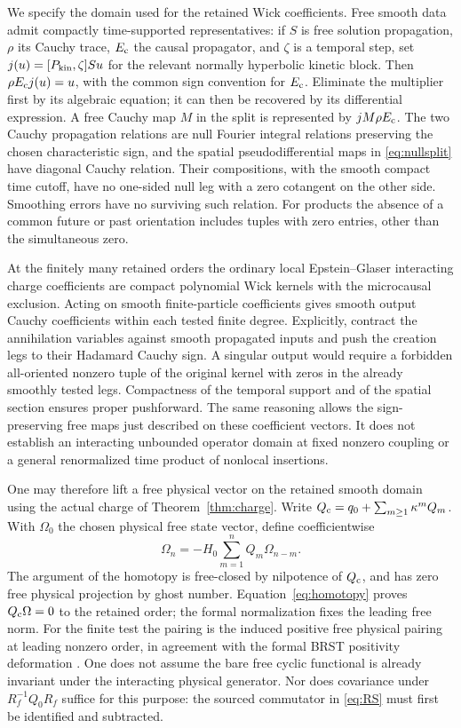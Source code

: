 We specify the domain used for the retained Wick coefficients. Free smooth data admit compactly time-supported representatives: if \(S\) is free solution propagation, \(\rho\) its Cauchy trace, \(E_{\rm c}\) the causal propagator, and \(\zeta\) is a temporal step, set \(j(u)=[P_{\rm kin},\zeta]Su\) for the relevant normally hyperbolic kinetic block. Then \(\rho E_{\rm c}j(u)=u\), with the common sign convention for \(E_{\rm c}\). Eliminate the multiplier first by its algebraic equation; it can then be recovered by its differential expression. A free Cauchy map \(M\) in the split is represented by \(jM\rho E_{\rm c}\). The two Cauchy propagation relations are null Fourier integral relations preserving the chosen characteristic sign, and the spatial pseudodifferential maps in \eqref{eq:nullsplit} have diagonal Cauchy relation. Their compositions, with the smooth compact time cutoff, have no one-sided null leg with a zero cotangent on the other side. Smoothing errors have no surviving such relation. For products the absence of a common future or past orientation includes tuples with zero entries, other than the simultaneous zero.

At the finitely many retained orders the ordinary local Epstein--Glaser interacting charge coefficients are compact polynomial Wick kernels with the microcausal exclusion. Acting on smooth finite-particle coefficients gives smooth output Cauchy coefficients within each tested finite degree. Explicitly, contract the annihilation variables against smooth propagated inputs and push the creation legs to their Hadamard Cauchy sign. A singular output would require a forbidden all-oriented nonzero tuple of the original kernel with zeros in the already smoothly tested legs. Compactness of the temporal support and of the spatial section ensures proper pushforward. The same reasoning allows the sign-preserving free maps just described on these coefficient vectors. It does not establish an interacting unbounded operator domain at fixed nonzero coupling or a general renormalized time product of nonlocal insertions.

One may therefore lift a free physical vector on the retained smooth domain using the actual charge of Theorem~\ref{thm:charge}. Write \(Q_{\mathrm c}=q_0+\sum_{m\geq1}\kappa^m Q_m\). With \(\Omega_0\) the chosen physical free state vector, define coefficientwise
\[
   \Omega_n=-H_0\sum_{m=1}^n Q_m\Omega_{n-m}.
\]
The argument of the homotopy is free-closed by nilpotence of \(Q_{\mathrm c}\), and has zero free physical projection by ghost number. Equation~\eqref{eq:homotopy} proves \(Q_{\mathrm c}\Omega=0\) to the retained order; the formal normalization fixes the leading free norm. For the finite test the pairing is the induced positive free physical pairing at leading nonzero order, in agreement with the formal BRST positivity deformation \cite[Thm.~4]{DF}. One does not assume the bare free cyclic functional is already invariant under the interacting physical generator. Nor does covariance under \(R_f^{-1}Q_0R_f\) suffice for this purpose: the sourced commutator in \eqref{eq:RS} must first be identified and subtracted.

